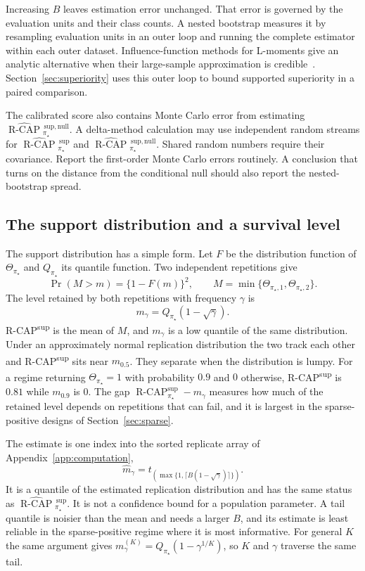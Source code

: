 \documentclass[11pt]{article}
\newcommand{\RCAP}{\operatorname{R\text{-}CAP}^{\mathrm{sup}}_{\pi_\star}}
\newcommand{\RCAPHat}{\widehat{\operatorname{R\text{-}CAP}}{}^{\,\mathrm{sup}}_{\pi_\star}}
\newcommand{\RCAPnullHat}{\widehat{\operatorname{R\text{-}CAP}}{}^{\,\mathrm{sup,null}}_{\pi_\star}}
\theoremstyle{remark}
\begin{document}
Increasing $B$ leaves estimation error unchanged. That error is governed by the evaluation units and their class counts. A nested bootstrap measures it by resampling evaluation units in an outer loop and running the complete estimator within each outer dataset. Influence-function methods for L-moments give an analytic alternative when their large-sample approximation is credible~\cite{hosking1990lmoments}. Section~\ref{sec:superiority} uses this outer loop to bound supported superiority in a paired comparison.

The calibrated score also contains Monte Carlo error from estimating $\RCAPnullHat$. A delta-method calculation may use independent random streams for $\RCAPHat$ and $\RCAPnullHat$. Shared random numbers require their covariance. Report the first-order Monte Carlo errors routinely. A conclusion that turns on the distance from the conditional null should also report the nested-bootstrap spread.

\subsection{The support distribution and a survival level}
\label{sec:survival}

The support distribution has a simple form. Let $F$ be the distribution function of $\Theta_{\pi_\star}$ and $Q_{\pi_\star}$ its quantile function. Two independent repetitions give
\[
\Pr(M>m)=\{1-F(m)\}^2,
\qquad
M=\min\{\Theta_{\pi_\star,1},\Theta_{\pi_\star,2}\}.
\]
The level retained by both repetitions with frequency $\gamma$ is
\begin{equation}
m_\gamma=Q_{\pi_\star}(1-\sqrt{\gamma}).
\label{eq:survival-level}
\end{equation}
R-CAP\textsuperscript{sup} is the mean of $M$, and $m_\gamma$ is a low quantile of the same distribution. Under an approximately normal replication distribution the two track each other and R-CAP\textsuperscript{sup} sits near $m_{0.5}$. They separate when the distribution is lumpy. For a regime returning $\Theta_{\pi_\star}=1$ with probability $0.9$ and $0$ otherwise, R-CAP\textsuperscript{sup} is $0.81$ while $m_{0.9}$ is $0$. The gap $\RCAP-m_\gamma$ measures how much of the retained level depends on repetitions that can fail, and it is largest in the sparse-positive designs of Section~\ref{sec:sparse}.

The estimate is one index into the sorted replicate array of Appendix~\ref{app:computation},
\[
\widehat m_\gamma
=
t_{\left(\max\{1,\lceil B(1-\sqrt{\gamma})\rceil\}\right)}.
\]
It is a quantile of the estimated replication distribution and has the same status as $\RCAPHat$. It is not a confidence bound for a population parameter. A tail quantile is noisier than the mean and needs a larger $B$, and its estimate is least reliable in the sparse-positive regime where it is most informative. For general $K$ the same argument gives $m_\gamma^{(K)}=Q_{\pi_\star}(1-\gamma^{1/K})$, so $K$ and $\gamma$ traverse the same tail.
\end{document}
